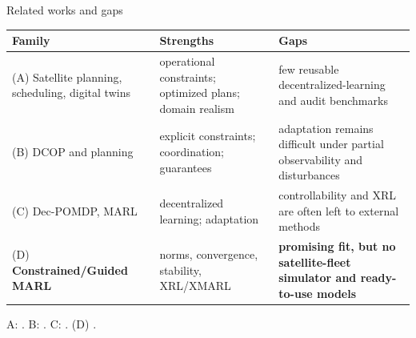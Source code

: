 \documentclass[aspectratio=169]{beamer}
\begin{document}
\begin{frame}{Related works and gaps}

  \scriptsize
  \setlength{\tabcolsep}{4pt}
  \renewcommand{\arraystretch}{1.5}
  \begin{tabularx}{\linewidth}{p{4.05cm}|X X}
    \toprule
    Family & Strengths                                                                        & Gaps \\
    \midrule
    (A) Satellite planning, scheduling, digital twins
           & operational constraints; optimized plans; domain realism
           & few reusable decentralized-learning and audit benchmarks                                \\
    \hdashline
    (B) DCOP and planning
           & explicit constraints; coordination; guarantees
           & adaptation remains difficult under partial observability and disturbances               \\
    \hdashline
    (C) Dec-POMDP, MARL
           & decentralized learning; adaptation
           & controllability and XRL are often left to external methods                              \\
    \hdashline
    (D) \textbf{Constrained/Guided MARL}
           & norms, convergence, stability, XRL/XMARL
           & \textbf{promising fit, but no satellite-fleet simulator and ready-to-use models}        \\
    \bottomrule
  \end{tabularx}

  \vspace{0.16cm}
  {\tiny
    A: \citep{ferrari2025ssp_survey,rocha2025iaeossp,govoni2026multi_sat_task_allocation}. B: \citep{Krigman2024,hoang2022proactive}. C: \citep{Oliehoek2016,rashid2018qmix,yu2021mappo}. (D) \textbf{\citep{ferber2003,Hubner2002,Hubner2007,puiutta2020xrlsurvey,soule2024moise_marl,garcia2015comprehensive,alshiekh2018safe}}.\par
  }

\end{frame}
\end{document}
